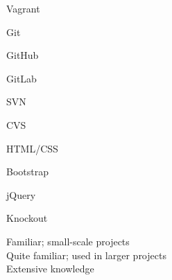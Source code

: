 \documentclass[a4paper,10pt]{article}
\begin{document}
\begin{itemize}
\begin{multicols}{3}
  \item Vagrant \hfill \twonotes
  \item Git     \hfill \twonotes
  \item GitHub  \hfill \twonotes
  \item GitLab  \hfill \twonotes
  \item SVN     \hfill \onenote
  \item CVS     \hfill \onenote
\end{multicols}

\begin{multicols}{3}
  \item HTML/CSS   \hfill \twonotes
  \item Bootstrap  \hfill \onenote
  \item jQuery     \hfill \onenote
  \item Knockout   \hfill \onenote
\end{multicols}

\end{itemize}

\vspace{1em}

\begin{center}
\parbox[c]{8cm}{
  \onenote Familiar; small-scale projects \\
  \twonotes Quite familiar; used in larger projects \\
  \threenotes Extensive knowledge
}
\end{center}
\end{document}
